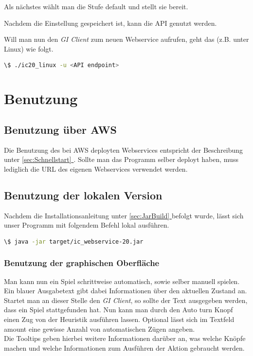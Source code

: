 \documentclass{article}
\newcommand{\fullref}[1]{\hyperref[{#1}]{\ref{#1} \nameref{#1}}} %
\newcommand{\gquote}[1]{\glqq #1\grqq} %
\newcommand{\displayimage}[1]{\begin{center}\makebox[\textwidth]{\texttt{[image: \#1]}}\end{center}}
\let\oldgls\gls
\renewcommand{\gls}[1]{\emph{\oldgls{#1}}} %
\begin{document}
Als nächstes wählt man die Stufe \gquote{default} und stellt sie bereit.
\displayimage{resources/aws_installation/select_default.png}
Nachdem die Einstellung gespeichert ist, kann die API genutzt werden.
\displayimage{resources/aws_installation/select_save.png}
Will man nun den \gls{GI Client} zum neuen Webservice aufrufen, geht das (z.B. unter Linux) wie folgt.
\begin{lstlisting}[language=bash, basicstyle=\footnotesize, numbers=none]
 \$ ./ic20_linux -u <API endpoint>
\end{lstlisting}

\newpage
\section{Benutzung}
\subsection{Benutzung über AWS}
Die Benutzung des bei AWS deployten Webservices entspricht der Beschreibung unter \fullref{sec:Schnellstart}. Sollte man das Programm selber deployt haben, muss lediglich die URL des eigenen Webservices verwendet werden.

\subsection{Benutzung der lokalen Version}
\label{sec:GuiNutzung}
Nachdem die Installationsanleitung unter \fullref{sec:JarBuild} befolgt wurde, lässt sich unser Programm mit folgendem Befehl lokal ausführen.
\begin{lstlisting}[language=bash, basicstyle=\footnotesize, numbers=none]
  \$ java -jar target/ic_webservice-20.jar
\end{lstlisting}
\subsubsection{Benutzung der graphischen Oberfläche}
Man kann nun ein Spiel schrittweise automatisch, sowie selber manuell spielen. \\
Ein blauer Ausgabetext gibt dabei Informationen über den aktuellen Zustand an. Startet man an dieser Stelle den \gls{GI Client}, so sollte der Text ausgegeben werden, dass ein Spiel stattgefunden hat.
Nun kann man durch den \gquote{Auto turn} Knopf einen Zug von der Heuristik ausführen lassen. Optional lässt sich im Textfeld \gquote{amount} eine gewisse Anzahl von automatischen Zügen angeben. \\
Die Tooltips geben hierbei weitere Informationen darüber an, was welche Knöpfe machen und welche Informationen zum Ausführen der Aktion gebraucht werden.
\end{document}
